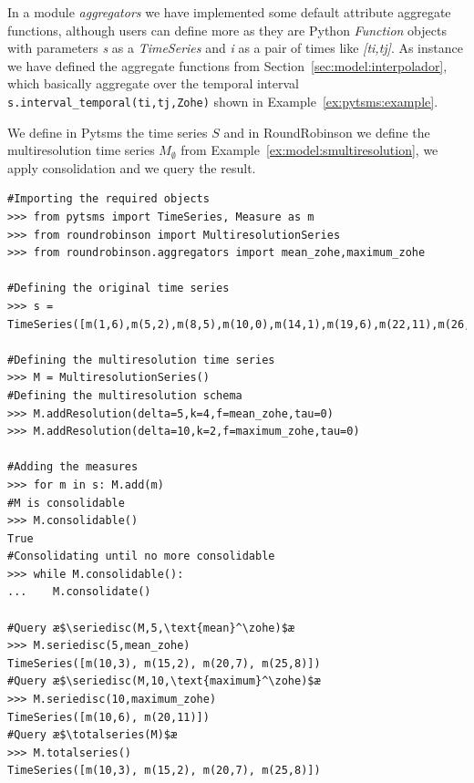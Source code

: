 In a module \emph{aggregators} we have implemented some default
attribute aggregate functions, although users can define more as they
are Python \emph{Function} objects with parameters \emph{s} as a
\emph{TimeSeries} and \emph{i} as a pair of times like
\emph{[ti,tj]}. As instance we have defined the \zohe{} aggregate
functions from Section~\ref{sec:model:interpolador}, which basically
aggregate over the temporal interval
\verb|s.interval_temporal(ti,tj,Zohe)| shown in
Example~\ref{ex:pytsms:example}.


\begin{example}
  We define in Pytsms the time series $S$ and in RoundRobinson we
  define the multiresolution time series $M_\emptyset$ from
  Example~\ref{ex:model:smultiresolution}, we apply consolidation and
  we query the result.

{\small
\begin{verbatim}
#Importing the required objects
>>> from pytsms import TimeSeries, Measure as m
>>> from roundrobinson import MultiresolutionSeries
>>> from roundrobinson.aggregators import mean_zohe,maximum_zohe

#Defining the original time series
>>> s = TimeSeries([m(1,6),m(5,2),m(8,5),m(10,0),m(14,1),m(19,6),m(22,11),m(26,6),m(29,0)])

#Defining the multiresolution time series
>>> M = MultiresolutionSeries()
#Defining the multiresolution schema
>>> M.addResolution(delta=5,k=4,f=mean_zohe,tau=0)
>>> M.addResolution(delta=10,k=2,f=maximum_zohe,tau=0)

#Adding the measures
>>> for m in s: M.add(m)
#M is consolidable
>>> M.consolidable()
True
#Consolidating until no more consolidable
>>> while M.consolidable():
...    M.consolidate()

#Query æ$\seriedisc(M,5,\text{mean}^\zohe)$æ
>>> M.seriedisc(5,mean_zohe)
TimeSeries([m(10,3), m(15,2), m(20,7), m(25,8)])
#Query æ$\seriedisc(M,10,\text{maximum}^\zohe)$æ
>>> M.seriedisc(10,maximum_zohe)
TimeSeries([m(10,6), m(20,11)])
#Query æ$\totalseries(M)$æ
>>> M.totalseries()
TimeSeries([m(10,3), m(15,2), m(20,7), m(25,8)])
\end{verbatim}
}
\end{example}





